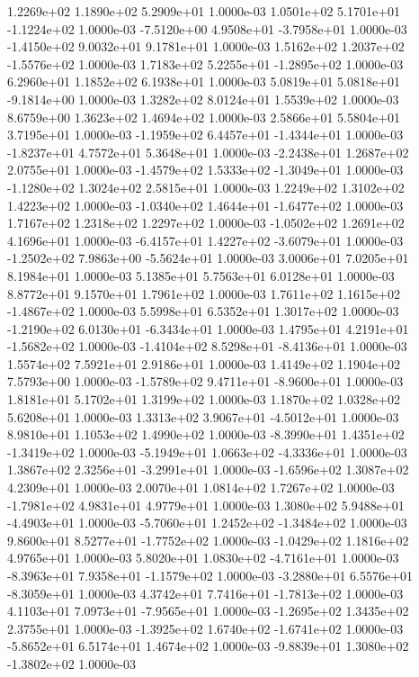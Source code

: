 1.2269e+02 1.1890e+02 5.2909e+01  1.0000e-03
 1.0501e+02  5.1701e+01 -1.1224e+02  1.0000e-03
-7.5120e+00  4.9508e+01 -3.7958e+01  1.0000e-03
-1.4150e+02  9.0032e+01  9.1781e+01  1.0000e-03
 1.5162e+02  1.2037e+02 -1.5576e+02  1.0000e-03
 1.7183e+02  5.2255e+01 -1.2895e+02  1.0000e-03
6.2960e+01 1.1852e+02 6.1938e+01  1.0000e-03
 5.0819e+01  5.0818e+01 -9.1814e+00  1.0000e-03
1.3282e+02 8.0124e+01 1.5539e+02  1.0000e-03
8.6759e+00 1.3623e+02 1.4694e+02  1.0000e-03
2.5866e+01 5.5804e+01 3.7195e+01  1.0000e-03
-1.1959e+02  6.4457e+01 -1.4344e+01  1.0000e-03
-1.8237e+01  4.7572e+01  5.3648e+01  1.0000e-03
-2.2438e+01  1.2687e+02  2.0755e+01  1.0000e-03
-1.4579e+02  1.5333e+02 -1.3049e+01  1.0000e-03
-1.1280e+02  1.3024e+02  2.5815e+01  1.0000e-03
1.2249e+02 1.3102e+02 1.4223e+02  1.0000e-03
-1.0340e+02  1.4644e+01 -1.6477e+02  1.0000e-03
1.7167e+02 1.2318e+02 1.2297e+02  1.0000e-03
-1.0502e+02  1.2691e+02  4.1696e+01  1.0000e-03
-6.4157e+01  1.4227e+02 -3.6079e+01  1.0000e-03
-1.2502e+02  7.9863e+00 -5.5624e+01  1.0000e-03
3.0006e+01 7.0205e+01 8.1984e+01  1.0000e-03
5.1385e+01 5.7563e+01 6.0128e+01  1.0000e-03
8.8772e+01 9.1570e+01 1.7961e+02  1.0000e-03
 1.7611e+02  1.1615e+02 -1.4867e+02  1.0000e-03
5.5998e+01 6.5352e+01 1.3017e+02  1.0000e-03
-1.2190e+02  6.0130e+01 -6.3434e+01  1.0000e-03
 1.4795e+01  4.2191e+01 -1.5682e+02  1.0000e-03
-1.4104e+02  8.5298e+01 -8.4136e+01  1.0000e-03
1.5574e+02 7.5921e+01 2.9186e+01  1.0000e-03
1.4149e+02 1.1904e+02 7.5793e+00  1.0000e-03
-1.5789e+02  9.4711e+01 -8.9600e+01  1.0000e-03
1.8181e+01 5.1702e+01 1.3199e+02  1.0000e-03
1.1870e+02 1.0328e+02 5.6208e+01  1.0000e-03
 1.3313e+02  3.9067e+01 -4.5012e+01  1.0000e-03
8.9810e+01 1.1053e+02 1.4990e+02  1.0000e-03
-8.3990e+01  1.4351e+02 -1.3419e+02  1.0000e-03
-5.1949e+01  1.0663e+02 -4.3336e+01  1.0000e-03
 1.3867e+02  2.3256e+01 -3.2991e+01  1.0000e-03
-1.6596e+02  1.3087e+02  4.2309e+01  1.0000e-03
2.0070e+01 1.0814e+02 1.7267e+02  1.0000e-03
-1.7981e+02  4.9831e+01  4.9779e+01  1.0000e-03
 1.3080e+02  5.9488e+01 -4.4903e+01  1.0000e-03
-5.7060e+01  1.2452e+02 -1.3484e+02  1.0000e-03
 9.8600e+01  8.5277e+01 -1.7752e+02  1.0000e-03
-1.0429e+02  1.1816e+02  4.9765e+01  1.0000e-03
 5.8020e+01  1.0830e+02 -4.7161e+01  1.0000e-03
-8.3963e+01  7.9358e+01 -1.1579e+02  1.0000e-03
-3.2880e+01  6.5576e+01 -8.3059e+01  1.0000e-03
 4.3742e+01  7.7416e+01 -1.7813e+02  1.0000e-03
 4.1103e+01  7.0973e+01 -7.9565e+01  1.0000e-03
-1.2695e+02  1.3435e+02  2.3755e+01  1.0000e-03
-1.3925e+02  1.6740e+02 -1.6741e+02  1.0000e-03
-5.8652e+01  6.5174e+01  1.4674e+02  1.0000e-03
-9.8839e+01  1.3080e+02 -1.3802e+02  1.0000e-03
